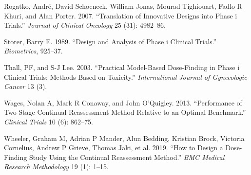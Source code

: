 \documentclass[
]{article}
\newlength{\cslhangindent}
\newlength{\cslentryspacingunit} %
\newenvironment{CSLReferences}[2] %
 {%
  \setlength{\parindent}{0pt}
  \ifodd #1
  \let\oldpar\par
  \def\par{\hangindent=\cslhangindent\oldpar}
  \fi
  \setlength{\parskip}{#2\cslentryspacingunit}
 }%
 {}
\begin{document}
\begin{CSLReferences}{1}{0}
\leavevmode{}%
Rogatko, André, David Schoeneck, William Jonas, Mourad Tighiouart, Fadlo
R Khuri, and Alan Porter. 2007. {``Translation of Innovative Designs
into Phase i Trials.''} \emph{Journal of Clinical Oncology} 25 (31):
4982--86.

\leavevmode{}%
Storer, Barry E. 1989. {``Design and Analysis of Phase i Clinical
Trials.''} \emph{Biometrics}, 925--37.

\leavevmode{}%
Thall, PF, and S-J Lee. 2003. {``Practical Model-Based Dose-Finding in
Phase i Clinical Trials: Methods Based on Toxicity.''}
\emph{International Journal of Gynecologic Cancer} 13 (3).

\leavevmode{}%
Wages, Nolan A, Mark R Conaway, and John O'Quigley. 2013. {``Performance
of Two-Stage Continual Reassessment Method Relative to an Optimal
Benchmark.''} \emph{Clinical Trials} 10 (6): 862--75.

\leavevmode{}%
Wheeler, Graham M, Adrian P Mander, Alun Bedding, Kristian Brock,
Victoria Cornelius, Andrew P Grieve, Thomas Jaki, et al. 2019. {``How to
Design a Dose-Finding Study Using the Continual Reassessment Method.''}
\emph{BMC Medical Research Methodology} 19 (1): 1--15.

\end{CSLReferences}
\end{document}
